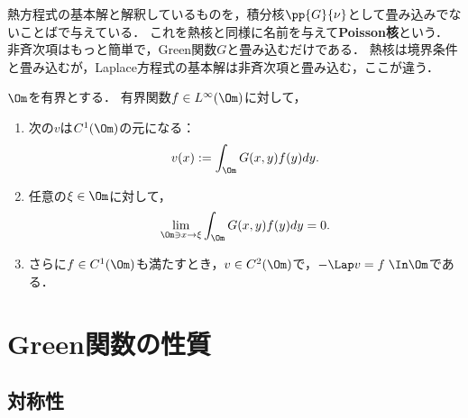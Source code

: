 \documentclass[uplatex,dvipdfmx]{jsreport}
\begin{document}
\begin{remarks}
    熱方程式の基本解と解釈しているものを，積分核$\pp{G}{\nu}$として畳み込みでないことばで与えている．
    これを熱核と同様に名前を与えて\textbf{Poisson核}という．
    非斉次項はもっと簡単で，Green関数$G$と畳み込むだけである．
    熱核は境界条件と畳み込むが，Laplace方程式の基本解は非斉次項と畳み込む，ここが違う．
\end{remarks}

\begin{proposition}[解の存在の十分条件]
    $\Om$を有界とする．
    有界関数$f\in L^\infty(\Om)$に対して，
    \begin{enumerate}
        \item 次の$v$は$C^1(\Om)$の元になる：
        \[v(x):=\int_\Om G(x,y)f(y)dy.\]
        \item 任意の$\xi\in\Om$に対して，
        \[\lim_{\Om\ni x\to\xi}\int_\Om G(x,y)f(y)dy=0.\]
        \item さらに$f\in C^1(\Om)$も満たすとき，$v\in C^2(\Om)$で，$-\Lap v=f\;\In\Om$である．
    \end{enumerate}
\end{proposition}

\section{Green関数の性質}

\subsection{対称性}
\end{document}

